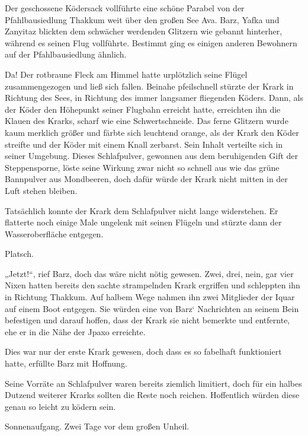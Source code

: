 Der geschossene Ködersack vollführte eine schöne Parabel von der Pfahlbausiedlung Thakkum weit über den großen See Ava. Barz, Yafka und Zanyitaz blickten dem schwächer werdenden Glitzern wie gebannt hinterher, während es seinen Flug vollführte. Bestimmt ging es einigen anderen Bewohnern auf der Pfahlbausiedlung ähnlich.

Da! Der rotbraune Fleck am Himmel hatte urplötzlich seine Flügel zusammengezogen und ließ sich fallen. Beinahe pfeilschnell stürzte der Krark in Richtung des Sees, in Richtung des immer langsamer fliegenden Köders. Dann, als der Köder den Höhepunkt seiner Flugbahn erreicht hatte, erreichten ihn die Klauen des Krarks, scharf wie eine Schwertschneide. Das ferne Glitzern wurde kaum merklich größer und färbte sich leuchtend orange, als der Krark den Köder streifte und der Köder mit einem Knall zerbarst. Sein Inhalt verteilte sich in seiner Umgebung. Dieses Schlafpulver, gewonnen aus dem beruhigenden Gift der Steppensporne, löste seine Wirkung zwar nicht so schnell aus wie das grüne Bannpulver aus Mondbeeren, doch dafür würde der Krark nicht mitten in der Luft stehen bleiben.

Tatsächlich konnte der Krark dem Schlafpulver nicht lange widerstehen. Er flatterte noch einige Male ungelenk mit seinen Flügeln und stürzte dann der Wasseroberfläche entgegen.

Platsch.

„Jetzt!“, rief Barz, doch das wäre nicht nötig gewesen. Zwei, drei, nein, gar vier Nixen hatten bereits den sachte strampelnden Krark ergriffen und schleppten ihn in Richtung Thakkum. Auf halbem Wege nahmen ihn zwei Mitglieder der Iquar auf einem Boot entgegen. Sie würden eine von Barz‘ Nachrichten an seinem Bein befestigen und darauf hoffen, dass der Krark sie nicht bemerkte und entfernte, ehe er in die Nähe der Jpaxo erreichte.

Dies war nur der erste Krark gewesen, doch dass es so fabelhaft funktioniert hatte, erfüllte Barz mit Hoffnung.

Seine Vorräte an Schlafpulver waren bereits ziemlich limitiert, doch für ein halbes Dutzend weiterer Krarks sollten die Reste noch reichen. Hoffentlich würden diese genau so leicht zu ködern sein.\bigskip







Sonnenaufgang. Zwei Tage vor dem großen Unheil.\bigskip



